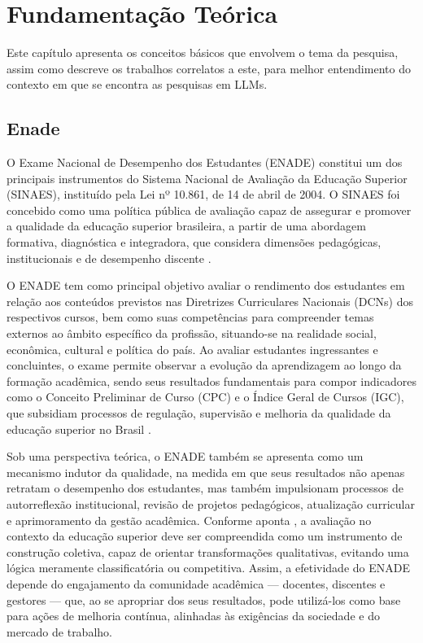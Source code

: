 
\chapter{Fundamentação Teórica}\label{fundamentacao}

Este capítulo apresenta os conceitos básicos que envolvem o tema da pesquisa, assim como descreve os trabalhos correlatos a este, para melhor entendimento do contexto em que se encontra as pesquisas em LLMs.

\section{Enade}
O Exame Nacional de Desempenho dos Estudantes (ENADE) constitui um dos principais instrumentos do Sistema Nacional de Avaliação da Educação Superior (SINAES), instituído pela Lei nº 10.861, de 14 de abril de 2004. O SINAES foi concebido como uma política pública de avaliação capaz de assegurar e promover a qualidade da educação superior brasileira, a partir de uma abordagem formativa, diagnóstica e integradora, que considera dimensões pedagógicas, institucionais e de desempenho discente \cite{brasil2004}.

O ENADE tem como principal objetivo avaliar o rendimento dos estudantes em relação aos conteúdos previstos nas Diretrizes Curriculares Nacionais (DCNs) dos respectivos cursos, bem como suas competências para compreender temas externos ao âmbito específico da profissão, situando-se na realidade social, econômica, cultural e política do país. Ao avaliar estudantes ingressantes e concluintes, o exame permite observar a evolução da aprendizagem ao longo da formação acadêmica, sendo seus resultados fundamentais para compor indicadores como o Conceito Preliminar de Curso (CPC) e o Índice Geral de Cursos (IGC), que subsidiam processos de regulação, supervisão e melhoria da qualidade da educação superior no Brasil \cite{inep2023}.

Sob uma perspectiva teórica, o ENADE também se apresenta como um mecanismo indutor da qualidade, na medida em que seus resultados não apenas retratam o desempenho dos estudantes, mas também impulsionam processos de autorreflexão institucional, revisão de projetos pedagógicos, atualização curricular e aprimoramento da gestão acadêmica. Conforme aponta \parencite{dias2003}, a avaliação no contexto da educação superior deve ser compreendida como um instrumento de construção coletiva, capaz de orientar transformações qualitativas, evitando uma lógica meramente classificatória ou competitiva. Assim, a efetividade do ENADE depende do engajamento da comunidade acadêmica — docentes, discentes e gestores — que, ao se apropriar dos seus resultados, pode utilizá-los como base para ações de melhoria contínua, alinhadas às exigências da sociedade e do mercado de trabalho.

